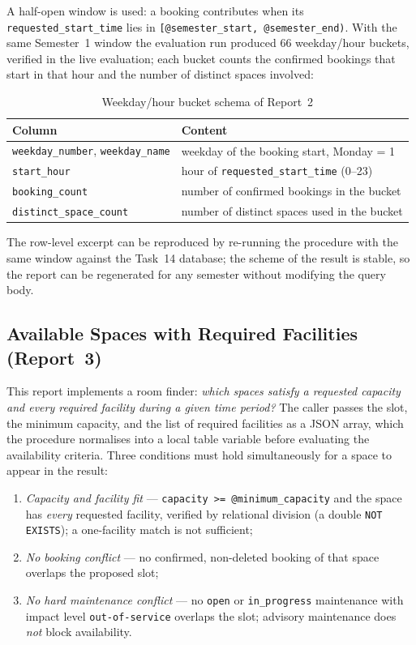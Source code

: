 A half-open window is used: a booking contributes when its
\texttt{requested\_start\_time} lies in \texttt{[@semester\_start,
@semester\_end)}. With the same Semester~1 window the evaluation run produced
66 weekday/hour buckets, verified in the live evaluation; each bucket counts
the confirmed bookings that start in that hour and the number of distinct
spaces involved:

\begin{table}[htbp]
    \centering
    \small
    \begin{tabularx}{\textwidth}{l X}
        \toprule
        \textbf{Column} & \textbf{Content} \\
        \midrule
        \texttt{weekday\_number}, \texttt{weekday\_name} & weekday of the
        booking start, Monday = 1 \\
        \texttt{start\_hour} & hour of \texttt{requested\_start\_time} (0--23) \\
        \texttt{booking\_count} & number of confirmed bookings in the bucket \\
        \texttt{distinct\_space\_count} & number of distinct spaces used in the bucket \\
        \bottomrule
    \end{tabularx}
    \caption{Weekday/hour bucket schema of Report~2}
    \label{tab:aq-q4}
\end{table}

The row-level excerpt can be reproduced by re-running the procedure with the
same window against the Task~14 database; the scheme of the result is stable,
so the report can be regenerated for any semester without modifying the query
body.

\subsection{Available Spaces with Required Facilities (Report~3)}

This report implements a room finder: \emph{which spaces satisfy a requested
capacity and every required facility during a given time period?} The caller
passes the slot, the minimum capacity, and the list of required facilities as
a JSON array, which the procedure normalises into a local table variable
before evaluating the availability criteria. Three conditions must hold
simultaneously for a space to appear in the result:

\begin{enumerate}[noitemsep]
    \item \emph{Capacity and facility fit} --- \texttt{capacity >=
    @minimum\_capacity} and the space has \emph{every} requested facility,
    verified by relational division (a double \texttt{NOT EXISTS}); a
    one-facility match is not sufficient;
    \item \emph{No booking conflict} --- no confirmed, non-deleted booking of
    that space overlaps the proposed slot;
    \item \emph{No hard maintenance conflict} --- no \texttt{open} or
    \texttt{in\_progress} maintenance with impact level
    \texttt{out-of-service} overlaps the slot; advisory maintenance does
    \emph{not} block availability.
\end{enumerate}

